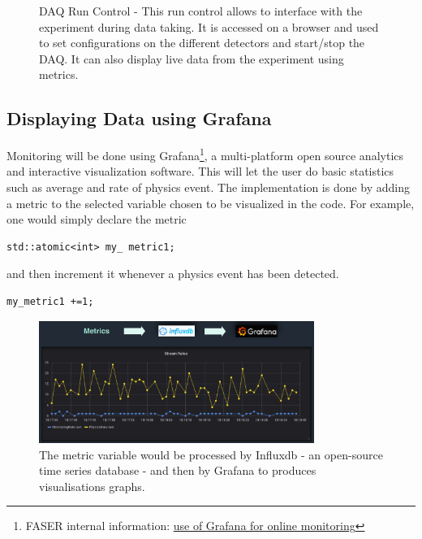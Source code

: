 \begin{figure}[htbp!] 
\centering    
{}
\caption[DAQ Run Control]{DAQ Run Control - This run control allows to interface with the experiment during data taking. It is accessed on a browser and used to set configurations on the different detectors and start/stop the DAQ. It can also display live data from the experiment using metrics.}
\label{fig:RunControl}
\end{figure}

\subsection{Displaying Data using Grafana}

Monitoring will be done using Grafana\footnote{FASER internal information:  \href{https://indico.cern.ch/event/832594/contributions/3544470/attachments/1926160/3188413/DAQ_monitoring_FASER_collaboration_meeting_Oct.pdf}{use of Grafana for online monitoring}}, a multi-platform open source analytics and interactive visualization software. This will let the user do basic statistics such as average and rate of physics event. The implementation is done by adding a metric to the selected variable chosen to be visualized in the code. For example, one would simply declare the metric
\begin{lstlisting}
std::atomic<int> my_ metric1;
\end{lstlisting}
and then increment it whenever a physics event has been detected.
\begin{lstlisting}
my_metric1 +=1;
\end{lstlisting}

\begin{figure}[htbp!] 
\centering    
\includegraphics[width=0.8\textwidth]{ChapterDAQ/Figs/GeneralDAQ/Grafana.jpg}
\caption[Grafana]{The metric variable would be processed by Influxdb - an open-source time series database - and then by Grafana to produces visualisations graphs.}
\label{fig:Grafana}
\end{figure}


